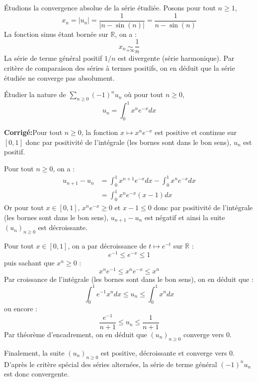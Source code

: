 \documentclass[a4paper,twoside,french,10pt]{VcCours}
\newcommand{\corr}{\textbf{Corrigé:}}
\newcommand{\Sum}[2]{\ensuremath{\textstyle{\sum\limits_{#1}^{#2}}}}
\begin{document}
\medskip

\noindent Étudions la convergence absolue de la série étudiée. Posons pour tout $n \geq 1$,
$$ x_n = \vert u_n \vert = \dfrac{1}{\vert n - \sin(n) \vert} = \dfrac{1}{n- \sin(n)}$$
La fonction sinus étant bornée sur $\mathbb{R}$, on a :
$$ x_n \underset{+ \infty}{\sim} \dfrac{1}{n}$$
La série de terme général positif $1/n$ est divergente (série harmonique). Par critère de comparaison des séries à termes positifs, on en déduit que la série étudiée ne converge pas absolument.

\medskip

\begin{Exercice}{} Étudier la nature de $\Sum{n \geq 0}{} (-1)^n u_n$ où pour tout $n \geq 0$,
\vspace{-0.4cm}
$$ u_n = \int_{0}^1 x^n e^{-x} dx$$
\end{Exercice}

\corr Pour tout $n \geq 0$, la fonction $x \mapsto x^n e^{-x}$ est positive et continue sur $[0,1]$ donc par positivité de l'intégrale (les bornes sont dans le bon sens), $u_n$ est positif.

\medskip

\noindent Pour tout $n \geq 0$, on a :
\begin{align*}
u_{n+1}-u_n & = \int_{0}^1 x^{n+1} e^{-x} dx - \int_{0}^1 x^{n} e^{-x} dx \\
& =\int_{0}^1 x^n e^{-x} (x-1) dx
\end{align*}
Or pour tout $x \in [0,1]$, $x^n e^{-x} \geq 0$ et $x-1 \leq 0$ donc par positivité de l'intégrale (les bornes sont dans le bon sens), $u_{n+1}-u_n$ est négatif et ainsi la suite $(u_n)_{n \geq 0}$ est décroissante.

\medskip

\noindent Pour tout $x \in [0,1]$, on a par décroissance de $t \mapsto e^{-t}$ sur $\mathbb{R}$ :
$$e^{-1} \leq e^{-x} \leq 1$$
puis sachant que $x^n \geq 0$ :
$$ x^n e^{-1} \leq x^n e^{-x} \leq x^n $$
Par croissance de l'intégrale (les bornes sont dans le bon sens), on en déduit que :
$$ \int_{0}^1 e^{-1}x^n dx \leq u_n \leq \int_{0}^1 x^n dx$$
ou encore :
$$ \frac{e^{-1}}{n+1} \leq u_n \leq \frac{1}{n+1}$$
Par théorème d'encadrement, on en déduit que $(u_n)_{n \geq 0}$ converge vers $0$.

\medskip

\noindent Finalement, la suite $(u_n)_{n \geq 0}$ est positive, décroissante et converge vers $0$. D'après le critère spécial des séries alternées, la série de terme général $(-1)^n u_n$ est donc convergente. 
\end{document}
